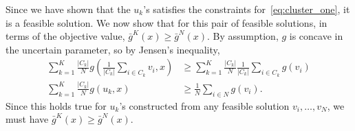 \documentclass[12pt]{article}
\theoremstyle{thmstyleone}%
\theoremstyle{thmstyletwo}%
\theoremstyle{thmstylethree}%
\begin{document}
\begin{appendices}
Since we have shown that the $u_k$'s satisfies the constraints for~\eqref{eq:cluster_one}, it is a feasible solution. We now show that for this pair of feasible solutions, in terms of the objective value, $\bar{g}^K(x) \geq \bar{g}^N(x)$.
By assumption, $g$ is concave in the uncertain parameter, so by Jensen's inequality,
\begin{align*}
\sum_{k = 1}^K \frac{|C_k|}{N} g \left(\frac{1}{|C_k|}\sum_{i \in C_k}v_i, x\right) &\geq  \sum_{k = 1}^K \frac{|C_k|}{N} \frac{1}{|C_k|}\sum_{i \in C_k} g(v_i)\\
\sum_{k = 1}^K \frac{|C_k|}{N}g(u_k,x) &\geq \frac{1}{N}\sum_{i \in N} g(v_i).
\end{align*}
Since this holds true for $u_k$'s constructed from any feasible solution $v_i, \dots, v_N$, we must have $\bar{g}^K(x) \geq \bar{g}^N(x)$.


\end{appendices}
\end{document}
